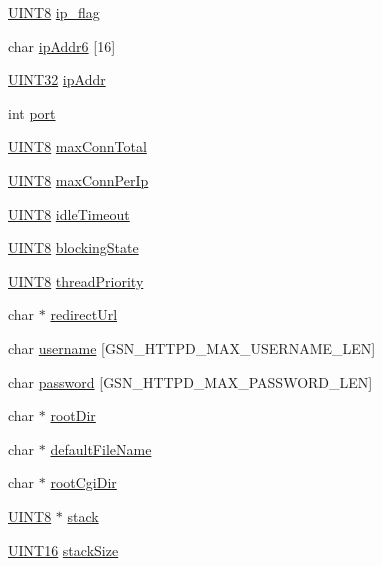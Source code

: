 \begin{DoxyCompactItemize}
\item 
\hyperlink{a00660_gab27e9918b538ce9d8ca692479b375b6a}{UINT8} \hyperlink{a00095_ad0126381cf1366366ff4b35d3a79b581}{ip\_\-flag}
\item 
char \hyperlink{a00095_ac889b27347bab80192c6fb582870de1b}{ipAddr6} \mbox{[}16\mbox{]}
\item 
\hyperlink{a00660_gae1e6edbbc26d6fbc71a90190d0266018}{UINT32} \hyperlink{a00095_a48e99cad0feadbd616a0cda7d9628826}{ipAddr}
\item 
int \hyperlink{a00095_a63c89c04d1feae07ca35558055155ffb}{port}
\item 
\hyperlink{a00660_gab27e9918b538ce9d8ca692479b375b6a}{UINT8} \hyperlink{a00095_a0882f2e0f23795ba45a974d3f8eae786}{maxConnTotal}
\item 
\hyperlink{a00660_gab27e9918b538ce9d8ca692479b375b6a}{UINT8} \hyperlink{a00095_a30eac69b4161acf08ca8f59846875220}{maxConnPerIp}
\item 
\hyperlink{a00660_gab27e9918b538ce9d8ca692479b375b6a}{UINT8} \hyperlink{a00095_aac2c222f5ad72d02b349e797f5601c8b}{idleTimeout}
\item 
\hyperlink{a00660_gab27e9918b538ce9d8ca692479b375b6a}{UINT8} \hyperlink{a00095_a770ddf3431339a8557a2c034d96a7a6d}{blockingState}
\item 
\hyperlink{a00660_gab27e9918b538ce9d8ca692479b375b6a}{UINT8} \hyperlink{a00095_a43d5ee14f34535c187383f957878ccbd}{threadPriority}
\item 
char $\ast$ \hyperlink{a00095_ad3e53ed21d0e77f5b0af7f29c292919a}{redirectUrl}
\item 
char \hyperlink{a00095_a0c0fcc39f73de9a78d2b8866e3164a46}{username} \mbox{[}GSN\_\-HTTPD\_\-MAX\_\-USERNAME\_\-LEN\mbox{]}
\item 
char \hyperlink{a00095_ae8e911decf3e8573145b7626e623270e}{password} \mbox{[}GSN\_\-HTTPD\_\-MAX\_\-PASSWORD\_\-LEN\mbox{]}
\item 
char $\ast$ \hyperlink{a00095_a8479521b0f87848099a96a1227c893b2}{rootDir}
\item 
char $\ast$ \hyperlink{a00095_a7d978795357c23a14bc0c4b22767a9c8}{defaultFileName}
\item 
char $\ast$ \hyperlink{a00095_a04f54a405b478d792ae115e74c6236b4}{rootCgiDir}
\item 
\hyperlink{a00660_gab27e9918b538ce9d8ca692479b375b6a}{UINT8} $\ast$ \hyperlink{a00095_afe48a70357b70eb2ce3f756fa87b9574}{stack}
\item 
\hyperlink{a00660_ga09f1a1fb2293e33483cc8d44aefb1eb1}{UINT16} \hyperlink{a00095_a3c4efd56e4d6098acf4db4d2f68ab196}{stackSize}

\end{DoxyCompactItemize}
